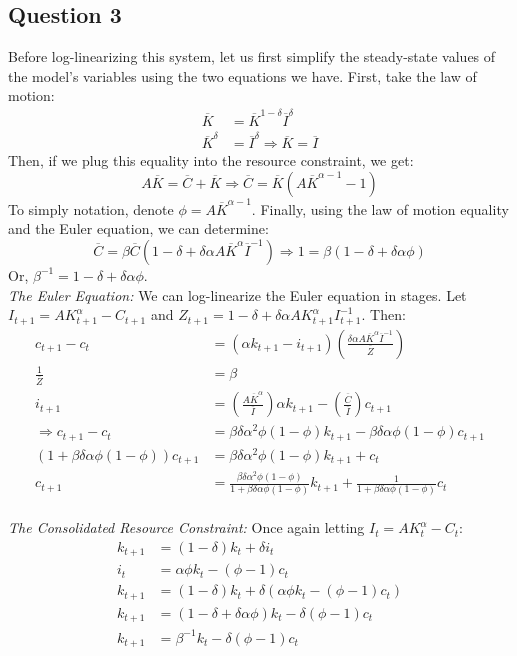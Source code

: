 \documentclass{article}
\begin{document}

\subsection*{Question 3}
Before log-linearizing this system, let us first simplify the steady-state values of the model's variables using the two equations we have. First, take the law of motion:
\begin{align*}
	\overline{K}		&= \overline{K}^{1-\delta}\overline{I}^\delta 	\\
	\overline{K}^\delta &= \overline{I}^\delta	\Rightarrow \overline{K} = \overline{I}
\end{align*}
Then, if we plug this equality into the resource constraint, we get:
\[
	A\overline{K} = \overline{C} + \overline{K} \Rightarrow \overline{C} = \overline{K}\left(A\overline{K}^{\alpha-1} - 1\right)
\]
To simply notation, denote ${\phi = A\overline{K}^{\alpha-1}}$. Finally, using the law of motion equality and the Euler equation, we can determine:
\[
	\overline{C} = \beta\overline{C}(1-\delta+\delta\alpha A\overline{K}^\alpha\overline{I}^{-1}) \Rightarrow 1 = \beta(1-\delta+\delta\alpha\phi)
\]
Or, ${\beta^{-1} = 1-\delta+\delta\alpha\phi}$.
\medskip \\
\textit{The Euler Equation:} We can log-linearize the Euler equation in stages. Let ${I_{t+1} = AK_{t+1}^\alpha - C_{t+1}}$ and ${Z_{t+1} = 1-\delta+\delta\alpha AK^\alpha_{t+1}I_{t+1}^{-1}}$. Then:
	\begin{align*}
		c_{t+1} - c_t &= \left(\alpha k_{t+1} - i_{t+1}\right)\left(\frac{\delta\alpha A\overline{K}^\alpha\overline{I}^{-1}}{\overline{Z}}\right)	\\
		\frac{1}{\overline{Z}} &= \beta																												\\
		i_{t+1}	&= \left(\frac{A\overline{K}^\alpha}{\overline{I}}\right)\alpha k_{t+1} - \left(\frac{\overline{C}}{\overline{I}}\right)c_{t+1}			\\
	\Rightarrow 	
		c_{t+1} - c_t &= \beta\delta\alpha^2\phi(1-\phi)k_{t+1} - \beta\delta\alpha\phi(1-\phi)c_{t+1}	\\
		\left(1 + \beta\delta\alpha\phi(1-\phi)\right)c_{t+1} &= \beta\delta\alpha^2\phi(1-\phi)k_{t+1} + c_t	\\
		c_{t+1} &= \frac{\beta\delta\alpha^2\phi(1-\phi)}{1 + \beta\delta\alpha\phi(1-\phi)}k_{t+1} + \frac{1}{1 + \beta\delta\alpha\phi(1-\phi)}c_t
	\end{align*}
\\
\textit{The Consolidated Resource Constraint:} Once again letting ${I_t = AK_t^\alpha - C_t}$:
	\begin{align*}
		k_{t+1} &= (1-\delta)k_t + \delta i_t										\\
		i_t 	&= \alpha\phi k_t - (\phi-1)c_t										\\
		k_{t+1} &= (1-\delta)k_t + \delta\left(\alpha\phi k_t - (\phi-1)c_t\right)	\\
		k_{t+1} &= (1-\delta + \delta\alpha\phi)k_t - \delta(\phi-1)c_t				\\
		k_{t+1} &= \beta^{-1}k_t - \delta(\phi-1)c_t				
	\end{align*}
\end{document}
